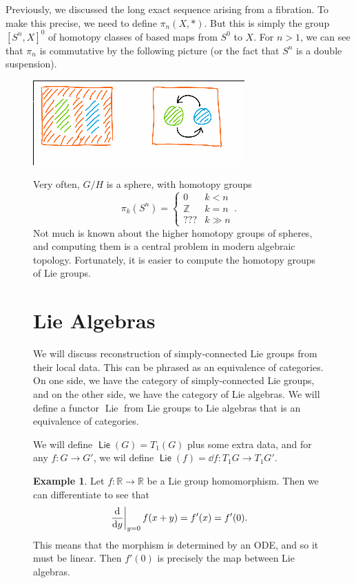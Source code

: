 \documentclass[leqno, openany]{memoir}
\theoremstyle{definition}
\newtheorem{exm}[thm]{Example}
\theoremstyle{remark}
\theoremstyle{plain}
\theoremstyle{definition}
\theoremstyle{remark}
\newcommand{\R}{\mathbb{R}}
\newcommand{\Z}{\mathbb{Z}}
\DeclareMathOperator{\Lie}{\mathsf{Lie}}
\begin{document}
Previously, we discussed the long exact sequence arising from a fibration. To
make this precise, we need to define $\pi_n(X,*)$. But this is simply the group
$[S^n, X]^0$ of homotopy classes of based maps from $S^0$ to $X$. For $n > 1$,
we can see that $\pi_n$ is commutative by the following picture (or the fact
that $S^n$ is a double suspension).  \begin{figure}[H] \centering
    \includegraphics[width=0.8\linewidth]{pinab} \caption{Proof that $\pi_2$ is
    abelian by picture}%

Very often, $G/H$ is a sphere, with homotopy groups \[ \pi_k(S^n) =
    \begin{cases} 0 & k < n \\ \Z & k = n \\ ??? & k \gg n \end{cases}. \] Not
    much is known about the higher homotopy groups of spheres, and computing
    them is a central problem in modern algebraic topology. Fortunately, it is
    easier to compute the homotopy groups of Lie groups.

\section{Lie Algebras}%

We will discuss reconstruction of simply-connected Lie groups from their local
data. This can be phrased as an equivalence of categories. On one side, we have
the category of simply-connected Lie groups, and on the other side, we have the
category of Lie algebras. We will define a functor $\operatorname{Lie}$ from
Lie groups to Lie algebras that is an equivalence of categories.

We will define $\Lie(G) = T_1(G)$ plus some extra data, and for any $f \colon G
\to G'$, we wil define $\Lie(f) = \dd f \colon T_1 G \to T_1 G'$.

\begin{exm} Let $f \colon \R \to \R$ be a Lie group homomorphism. Then we can
    differentiate to see that \[ \eval{\dv{y}}_{y = 0} f(x+y) = f'(x) = f'(0).
    \] This means that the morphism is determined by an ODE, and so it must be
    linear. Then $f'(0)$ is precisely the map between Lie algebras.  \end{exm}


\end{figure}
\end{document}
